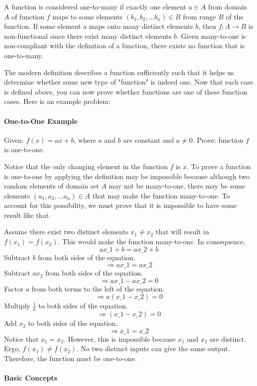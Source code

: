 A function is considered one-to-many if exactly one element $a \in A$ from domain $A$ of function $f$ maps to some elements $(b_1, b_2, \ldots b_n) \in B$ from range $B$ of the function. If some element $a$ maps onto many distinct elements $b$, then $f:A \to B$ is non-functional since there exist many distinct elements $b$. Given many-to-one is non-compliant with the definition of a function, there exists no function that is one-to-many.

The modern definition describes a function sufficiently such that it helps us determine whether some new type of "function" is indeed one. Now that each case is defined above, you can now prove whether functions are one of these function cases. Here is an example problem:

\paragraph{One-to-One Example}

Given: $f(x) = ax + b$, where $a$ and $b$ are constant and $a \neq 0$.
Prove: function $f$ is one-to-one.

Notice that the only changing element in the function $f$ is $x$. To prove a function is one-to-one by applying the definition may be impossible because although two random elements of domain set $A$ may not be many-to-one, there may be some elements $(a_1, a_2, \ldots a_n) \in A$ that may make the function many-to-one. To account for this possibility, we must prove that it is impossible to have some result like that.

Assume there exist two distinct elements $x_1 \neq x_2$ that will result in $f(x_1) = f(x_2)$. This would make the function many-to-one. In consequence,
$$
ax\_1 + b = ax\_2 + b
$$
Subtract $b$ from both sides of the equation.
$$
\Rightarrow ax\_1 = ax\_2
$$
Subtract $ax_2$ from both sides of the equation.
$$
\Rightarrow ax\_1 - ax\_2 = 0
$$
Factor $a$ from both terms to the left of the equation.
$$
\Rightarrow a(x\_1 - x\_2) = 0
$$
Multiply $\frac{1}{a}$ to both sides of the equation.
$$
\Rightarrow (x\_1 - x\_2) = 0
$$
Add $x_2$ to both sides of the equation.
$$
\Rightarrow x\_1 = x\_2
$$
Notice that $x_1 = x_2$. However, this is impossible because $x_1$ and $x_2$ are distinct. Ergo, $f(x_1) \neq f(x_2)$. No two distinct inputs can give the same output. Therefore, the function must be one-to-one.

\paragraph{Basic Concepts}

